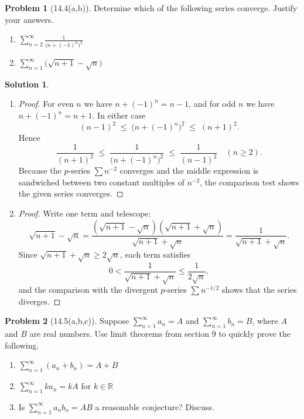 \documentclass[12pt]{article}
\theoremstyle{definition} %
\newtheorem{solution}{Solution}
\newtheorem{problem}{Problem}
\theoremstyle{plain} %
\begin{document}
\begin{problem}[14.4(a,b)]
   Determine which of the following series converge. Justify your answers.
   \begin{enumerate}
     \item $\displaystyle\sum_{n=2}^{\infty} \frac{1}{\bigl(n+(-1)^{n}\bigr)^{2}}$
     \item $\displaystyle\sum_{n=1}^{\infty}\bigl(\sqrt{n+1}-\sqrt{n}\bigr)$
   \end{enumerate}
\end{problem}

\begin{solution}
  \begin{enumerate}
  \item \begin{proof}
    For even $n$ we have $n+(-1)^n=n-1$, and for odd $n$ we have
    $n+(-1)^n=n+1$.  In either case
    \[
       (n-1)^2 \;\le\; \bigl(n+(-1)^n\bigr)^2 \;\le\; (n+1)^2 .
    \]
    Hence
    \[
       \frac{1}{(n+1)^2} \;\le\;
       \frac{1}{\bigl(n+(-1)^n\bigr)^2} \;\le\;
       \frac{1}{(n-1)^2}\quad(n\ge 2).
    \]
    Because the $p$-series $\sum n^{-2}$ converges and the middle
    expression is sandwiched between two constant multiples of $n^{-2}$,
    the comparison test shows the given series converges.
  \end{proof}

  \item \begin{proof}
    Write one term and telescope:
    \[
      \sqrt{n+1}-\sqrt{n}
      =\frac{(\sqrt{n+1}-\sqrt{n})(\sqrt{n+1}+\sqrt{n})}{\sqrt{n+1}+\sqrt{n}}
      =\frac{1}{\sqrt{n+1}+\sqrt{n}}.
    \]
    Since $\sqrt{n+1}+\sqrt{n}\ge 2\sqrt{n}$, each term satisfies
    \[
      0 < \frac{1}{\sqrt{n+1}+\sqrt{n}} \le \frac{1}{2\sqrt{n}},
    \]
    and the comparison with the divergent $p$-series
    $\sum n^{-1/2}$ shows that the series diverges.
  \end{proof}
  \end{enumerate}
\end{solution}
\begin{problem}[14.5(a,b,c)]
   Suppose $\sum_{n=1}^{\infty} a_{n} =A$ and $\sum_{n=1}^{\infty} b_{n} =B$, where $A$ and $B$ are real numbers. Use limit theorems from section $9$ to quickly prove the following.
   \begin{enumerate}
    \item $\sum_{n=1}^{\infty} (a_{n} +b_{n}  )=A+B$
    \item $\sum_{n=1}^{\infty} ka_{n} =kA$ for $k\in \mathbb{{R}} $   
    \item Is $\sum_{n=1}^{\infty} a_{n}b_{n} =AB$ a reasonable conjecture? Discuss.  
   \end{enumerate}  
\end{problem}
\end{document}
